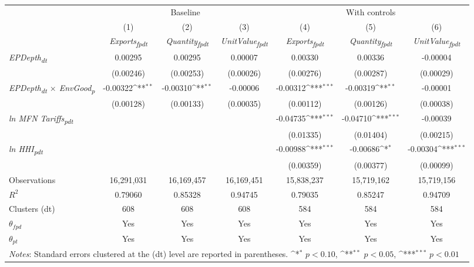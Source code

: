 {
\def\sym#1{\ifmmode^{#1}\else\(^{#1}\)\fi}
\begin{tabular}{l*{6}{c}}
\toprule
&\multicolumn{3}{c}{Baseline}&\multicolumn{3}{c}{With controls}\\\cmidrule(lr){2-4}\cmidrule(lr){5-7}
&(1)&(2)&(3)&(4)&(5)&(6)\\
&\textit{Exports\textsubscript{fpdt}}&\textit{Quantity\textsubscript{fpdt}}&\textit{UnitValue\textsubscript{fpdt}}&\textit{Exports\textsubscript{fpdt}}&\textit{Quantity\textsubscript{fpdt}}&\textit{UnitValue\textsubscript{fpdt}}\\
\midrule
\textit{EPDepth\textsubscript{dt}} & 0.00295 & 0.00295 & 0.00007 & 0.00330 & 0.00336 & -0.00004\\
 & (0.00246) & (0.00253) & (0.00026) & (0.00276) & (0.00287) & (0.00029)\\
\addlinespace
\textit{EPDepth\textsubscript{dt} $\times$ EnvGood\textsubscript{p}} & -0.00322\sym{**} & -0.00310\sym{**} & -0.00006 & -0.00312\sym{***} & -0.00319\sym{**} & -0.00001\\
 & (0.00128) & (0.00133) & (0.00035) & (0.00112) & (0.00126) & (0.00038)\\
\addlinespace
\textit{ln MFN Tariffs\textsubscript{pdt}} &  &  &  & -0.04735\sym{***} & -0.04710\sym{***} & -0.00039\\
 &  &  &  & (0.01335) & (0.01404) & (0.00215)\\
\addlinespace
\textit{ln HHI\textsubscript{pdt}} &  &  &  & -0.00988\sym{***} & -0.00686\sym{*} & -0.00304\sym{***}\\
 &  &  &  & (0.00359) & (0.00377) & (0.00099)\\
\midrule
Observations & 16,291,031 & 16,169,457 & 16,169,451 & 15,838,237 & 15,719,162 & 15,719,156\\
$R^{2}$ & 0.79060 & 0.85328 & 0.94745 & 0.79035 & 0.85247 & 0.94709\\
Clusters (dt) & 608 & 608 & 608 & 584 & 584 & 584\\
$\theta_{fpd}$ & Yes & Yes & Yes & Yes & Yes & Yes\\
$\theta_{pt}$ & Yes & Yes & Yes & Yes & Yes & Yes\\
\bottomrule
\multicolumn{7}{l}{\footnotesize \textit{Notes}: Standard errors clustered at the (dt) level are reported in parentheses. \sym{*} \(p<0.10\), \sym{**} \(p<0.05\), \sym{***} \(p<0.01\)}\\
\end{tabular}
}
